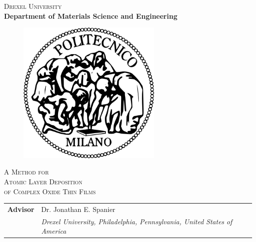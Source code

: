 \begin{titlepage}
\begin{center}
  {\Huge
  \textsc{Drexel University}\\
  \vspace{0.5em}
  \textbf{\Large
  Department of Materials Science and Engineering}}\\
  \vspace*{0.5cm}
  \begin{figure}[htbp]
    \begin{center}
      \includegraphics[width=7cm]{./pictures/LogoPoliMi}
    \end{center}
  \end{figure}
   {\huge\textsc{
  A Method for\\
  Atomic Layer Deposition\\
  of Complex Oxide Thin Films\\
  }}

  
  
\end{center}
\large
\begin{centering}
\vspace{0.2cm}
\begin{tabular*}{0.75\textwidth}{>{\bfseries}r l}
  Advisor & Dr. Jonathan E. Spanier \\
  & \emph{\tiny Drexel University, Philadelphia, Pennsylvania, United States of America}
  \vspace{0.3cm}
\end{tabular*}


\end{centering}
\end{titlepage}
